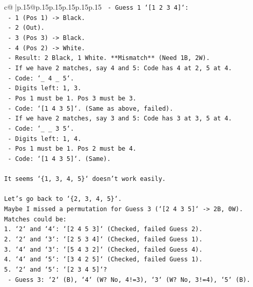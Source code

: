\documentclass{article}
\begin{document}
{\begin{supertabular}{c@{$\;$}|p{.15\linewidth}@{}p{.15\linewidth}p{.15\linewidth}p{.15\linewidth}p{.15\linewidth}p{.15\linewidth}}
{{{\texttt{        {-} Guess 1 `{[}1 2 3 4{]}`:} \\
\texttt{            {-} 1 (Pos 1) {-}> Black.} \\
\texttt{            {-} 2 (Out).} \\
\texttt{            {-} 3 (Pos 3) {-}> Black.} \\
\texttt{            {-} 4 (Pos 2) {-}> White.} \\
\texttt{            {-} Result: 2 Black, 1 White. **Mismatch** (Need 1B, 2W).} \\
\texttt{    {-} If we have 2 matches, say 4 and 5: Code has 4 at 2, 5 at 4.} \\
\texttt{        {-} Code: `\_ 4 \_ 5`.} \\
\texttt{        {-} Digits left: 1, 3.} \\
\texttt{        {-} Pos 1 must be 1. Pos 3 must be 3.} \\
\texttt{        {-} Code: `{[}1 4 3 5{]}`. (Same as above, failed).} \\
\texttt{    {-} If we have 2 matches, say 3 and 5: Code has 3 at 3, 5 at 4.} \\
\texttt{        {-} Code: `\_ \_ 3 5`.} \\
\texttt{        {-} Digits left: 1, 4.} \\
\texttt{        {-} Pos 1 must be 1. Pos 2 must be 4.} \\
\texttt{        {-} Code: `{[}1 4 3 5{]}`. (Same).} \\
\\ 
\texttt{It seems `\{1, 3, 4, 5\}` doesn't work easily.} \\
\\ 
\texttt{Let's go back to `\{2, 3, 4, 5\}`.} \\
\texttt{Maybe I missed a permutation for Guess 3 (`{[}2 4 3 5{]}` {-}> 2B, 0W).} \\
\texttt{Matches could be:} \\
\texttt{1.  `2` and `4`: `{[}2 4 5 3{]}` (Checked, failed Guess 2).} \\
\texttt{2.  `2` and `3`: `{[}2 5 3 4{]}` (Checked, failed Guess 1).} \\
\texttt{3.  `4` and `3`: `{[}5 4 3 2{]}` (Checked, failed Guess 4).} \\
\texttt{4.  `4` and `5`: `{[}3 4 2 5{]}` (Checked, failed Guess 1).} \\
\texttt{5.  `2` and `5`: `{[}2 3 4 5{]}`?} \\
\texttt{    {-} Guess 3: `2` (B), `4` (W? No, 4!=3), `3` (W? No, 3!=4), `5` (B).} \\
}}}
\end{supertabular}}
\end{document}
